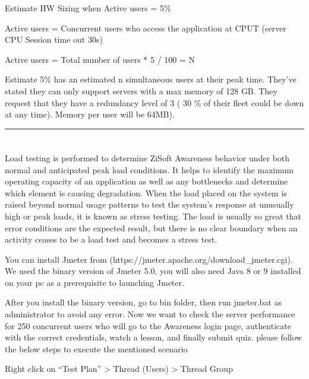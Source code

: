 \documentclass[letterpaper,10pt,english]{sphinxmanual}
\begin{document}
Estimate HW Sizing when Active users = 5\%

Active users = Concurrent users who access the application at CPUT (server CPU Session time out 30s)

Active users = Total number of users * 5 / 100 = N

Estimate 5\%  has an estimated n simultaneous users at their peak time. They’ve stated they can only support servers with a max memory of 128 GB. They request that they have a redundancy level of 3 ( 30 \% of their fleet could be down at any time). Memory per user will be 64MB).


\bigskip\hrule\bigskip



\section{}
\label{\detokenize{sizing:zisoft-awareness-load-testing}}
Load testing is performed to determine ZiSoft Awareness behavior under both normal and anticipated peak load conditions. It helps to identify the maximum operating capacity of an application as well as any bottlenecks and determine which element is causing degradation. When the load placed on the system is raised beyond normal usage patterns to test the system’s response at unusually high or peak loads, it is known as stress testing. The load is usually so great that error conditions are the expected result, but there is no clear boundary when an activity ceases to be a load test and becomes a stress test.


You can install Jmeter from (https://jmeter.apache.org/download\_jmeter.cgi). We used the binary version of Jmeter 5.0, you will also need Java 8 or 9 installed on your pc as a prerequisite to launching Jmeter.


After you install the binary version, go to bin folder, then run jmeter.bat as administrator to avoid any error. Now we want to check the server performance for 250 concurrent users who will go to the Awareness login page, authenticate with the correct credentials, watch a lesson, and finally submit quiz.
please follow the below steps to execute the mentioned scenario

Right click on “Test Plan” \textendash{}\textgreater{} Thread (Users) \textendash{}\textgreater{} Thread Group
\end{document}
